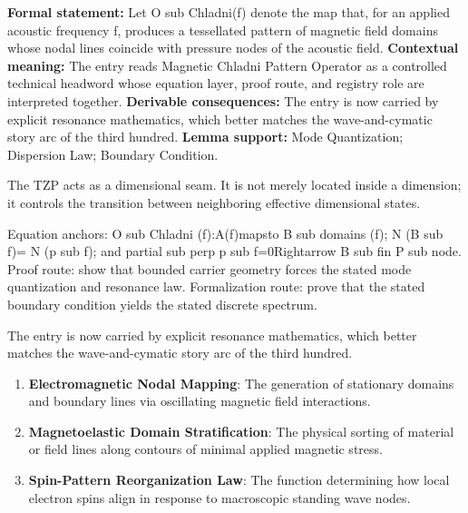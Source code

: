 \begingroup\footnotesize\setlength{\emergencystretch}{3em}\sloppy
\textbf{Formal statement:} Let O sub Chladni(f) denote the map that, for an applied acoustic frequency f, produces a tessellated pattern of magnetic field domains whose nodal lines coincide with pressure nodes of the acoustic field. \textbf{Contextual meaning:} The entry reads Magnetic Chladni Pattern Operator as a controlled technical headword whose equation layer, proof route, and registry role are interpreted together. \textbf{Derivable consequences:} The entry is now carried by explicit resonance mathematics, which better matches the wave-and-cymatic story arc of the third hundred. \textbf{Lemma support:} Mode Quantization; Dispersion Law; Boundary Condition.\par
\endgroup

The TZP acts as a dimensional seam. It is not merely located inside a dimension; it controls the transition between neighboring effective dimensional states.

Equation anchors: O sub Chladni (f):A(f)mapsto B sub domains (f); N (B sub f)= N (p sub f); and partial sub perp p sub f=0Rightarrow B sub fin P sub node. Proof route: show that bounded carrier geometry forces the stated mode quantization and resonance law. Formalization route: prove that the stated boundary condition yields the stated discrete spectrum.

The entry is now carried by explicit resonance mathematics, which better matches the wave-and-cymatic story arc of the third hundred.
\endgroup

\begin{enumerate}[leftmargin=1.6em,itemsep=6pt,topsep=4pt]
\item \textbf{Electromagnetic Nodal Mapping}: The generation of stationary domains and boundary lines via oscillating magnetic field interactions.
\item \textbf{Magnetoelastic Domain Stratification}: The physical sorting of material or field lines along contours of minimal applied magnetic stress.
\item \textbf{Spin-Pattern Reorganization Law}: The function determining how local electron spins align in response to macroscopic standing wave nodes.
\end{enumerate}

